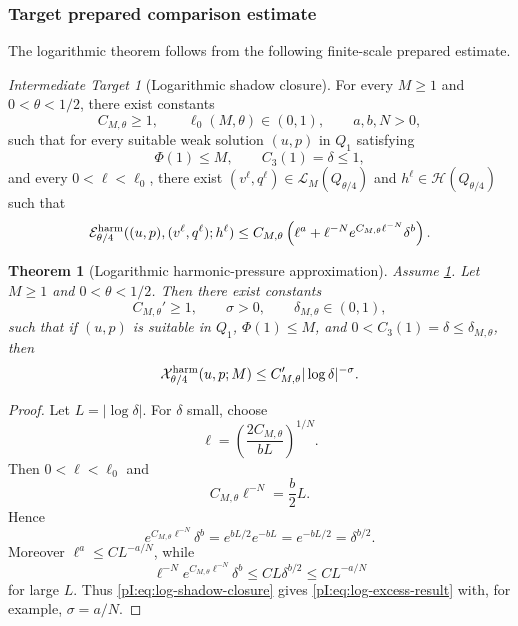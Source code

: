 \documentclass[11pt]{article}
\numberwithin{equation}{section}
\theoremstyle{plain}
\newtheorem{theorem}{Theorem}[section]
\theoremstyle{definition}
\theoremstyle{remark}
\newtheorem{target}{Intermediate Target}[section]
\newcommand{\calE}{\mathcal E}
\newcommand{\calH}{\mathcal H}
\newcommand{\calL}{\mathcal L}
\newcommand{\calX}{\mathcal X}
\begin{document}
\subsubsection{Target prepared comparison estimate}

The logarithmic theorem follows from the following finite-scale prepared estimate.

\begin{target}[Logarithmic shadow closure]\label{pI:ass:log-shadow-closure}
For every \(M\ge1\) and \(0<\theta<1/2\), there exist constants
\[
        C_{M,\theta}\ge1,
        \qquad
        \ell_0(M,\theta)\in(0,1),
        \qquad
        a,b,N>0,
\]
such that for every suitable weak solution \((u,p)\) in \(Q_1\) satisfying
\[
        \Phi(1)\le M,
        \qquad
        C_3(1)=\delta\le1,
\]
and every \(0<\ell<\ell_0\), there exist \((v^\ell,q^\ell)\in\calL_M(Q_{\theta/4})\) and \(h^\ell\in\calH(Q_{\theta/4})\) such that
\begin{equation}\label{pI:eq:log-shadow-closure}
\calE^{\rm harm}_{\theta/4}((u,p),(v^\ell,q^\ell);h^\ell)
\le
C_{M,\theta}
\left(
\ell^a+
\ell^{-N}e^{C_{M,\theta}\ell^{-N}}\delta^b
\right).
\end{equation}
\end{target}

\begin{theorem}[Logarithmic harmonic-pressure approximation]\label{pI:thm:log-approx}
Assume \cref{pI:ass:log-shadow-closure}.  Let \(M\ge1\) and \(0<\theta<1/2\).  Then there exist constants
\[
        C_{M,\theta}'\ge1,
        \qquad
        \sigma>0,
        \qquad
        \delta_{M,\theta}\in(0,1),
\]
such that if \((u,p)\) is suitable in \(Q_1\), \(\Phi(1)\le M\), and \(0<C_3(1)=\delta\le\delta_{M,\theta}\), then
\begin{equation}\label{pI:eq:log-excess-result}
        \calX^{\rm harm}_{\theta/4}(u,p;M)
        \le C_{M,\theta}'|\log\delta|^{-\sigma}.
\end{equation}
\end{theorem}

\begin{proof}
Let \(L=|\log\delta|\).  For \(\delta\) small, choose
\[
        \ell=\left(\frac{2C_{M,\theta}}{bL}\right)^{1/N}.
\]
Then \(0<\ell<\ell_0\) and
\[
        C_{M,\theta}\ell^{-N}=\frac b2 L.
\]
Hence
\[
        e^{C_{M,\theta}\ell^{-N}}\delta^b
        =e^{bL/2}e^{-bL}=e^{-bL/2}=\delta^{b/2}.
\]
Moreover \(\ell^a\le C L^{-a/N}\), while
\[
        \ell^{-N}e^{C_{M,\theta}\ell^{-N}}\delta^b
        \le C L\delta^{b/2}\le C L^{-a/N}
\]
for large \(L\).  Thus \eqref{pI:eq:log-shadow-closure} gives \eqref{pI:eq:log-excess-result} with, for example, \(\sigma=a/N\).
\end{proof}
\end{document}
